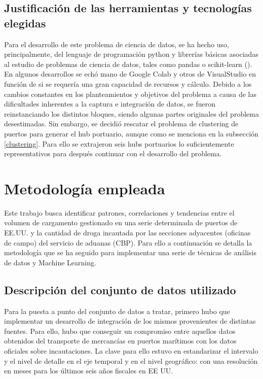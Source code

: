 \documentclass[12pt]{article}
\begin{document}
	\subsection{Justificación de las herramientas y tecnologías elegidas}
	Para el desarrollo de este problema de ciencia de datos, se ha hecho uso, principalmente, del lenguaje de programación python y librerías básicas asociadas al estudio de problemas de ciencia de datos, tales como pandas o scikit-learn (\cite{scikit-learn}). En algunos desarrollos se echó mano de Google Colab y otros de VisualStudio en función de si se requería una gran capacidad de recursos y cálculo. Debido a los cambios constantes en los planteamientos y objetivos del problema a causa de las dificultades inherentes a la captura e integración de datos, se fueron reinstanciando los distintos bloques, siendo algunas partes originales del problema desestimadas. Sin embargo, se decidió rescatar el problema de clustering de puertos para generar el hub portuario, aunque como se menciona en la subsección \ref{clustering}. Para ello se extrajeron seis hubs portuarios lo suficientemente representativos para después continuar con el desarrollo del problema.
	
\newpage
	
\section{Metodología empleada}	
Este trabajo busca identificar patrones, correlaciones y tendencias entre el volumen de cargamento gestionado en una serie determinada de puertos de EE.UU. y la cantidad de droga incautada por las secciones adyacentes (oficinas de campo) del servicio de aduanas (CBP). Para ello a continuación se detalla la metodología que se ha seguido para implementar una serie de técnicas de análisis de datos y Machine Learning.

	\subsection{Descripción del conjunto de datos utilizado}
	Para la puesta a punto del conjunto de datos a tratar, primero hubo que implementar un desarrollo de integración de los mismos provenientes de distintas fuentes.
	Para ello, hubo que conseguir un compromiso entre aquellos datos obtenidos del transporte de mercancías en puertos marítimos con los datos oficiales sobre incautaciones. La clave para ello estuvo en estandarizar el intervalo y el nivel de detalle en el eje temporal  y en el nivel geográfico: con una resolución en meses para los últimos seis años fiscales en EE UU.
	
\end{document}
